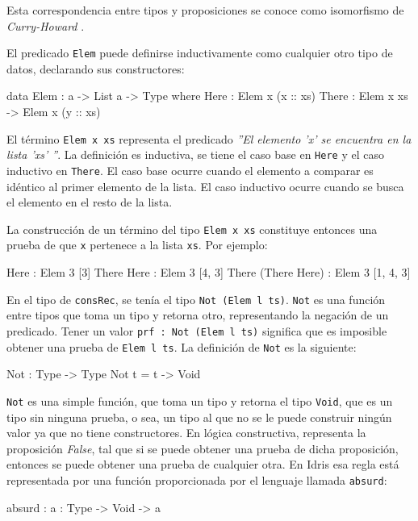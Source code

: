 Esta correspondencia entre tipos y proposiciones se conoce como isomorfismo de \textit{Curry-Howard} \cite{Howard80}.

El predicado \texttt{Elem} puede definirse inductivamente como cualquier otro tipo de datos, declarando sus constructores:

\begin{code}
data Elem : a -> List a -> Type where
  Here : Elem x (x :: xs)
  There : Elem x xs -> Elem x (y :: xs)
\end{code}

El término \texttt{Elem x xs} representa el predicado \textit{''El elemento 'x' se encuentra en la lista 'xs' ''}. La definición es inductiva, se tiene el caso base en \texttt{Here} y el caso inductivo en \texttt{There}. El caso base ocurre cuando el elemento a comparar es idéntico al primer elemento de la lista. El caso inductivo ocurre cuando se busca el elemento en el resto de la lista.

La construcción de un término del tipo \texttt{Elem x xs} constituye entonces una prueba de que \texttt{x} pertenece a la lista \texttt{xs}. Por ejemplo:

\begin{code}
Here : Elem 3 [3]
There Here : Elem 3 [4, 3]
There (There Here) : Elem 3 [1, 4, 3]
\end{code}

En el tipo de \texttt{consRec}, se tenía el tipo \texttt{Not (Elem l ts)}. \texttt{Not} es una función entre tipos que toma un tipo y retorna otro, representando la negación de un predicado. Tener un valor \texttt{prf : Not (Elem l ts)} significa que es imposible obtener una prueba de \texttt{Elem l ts}. La definición de \texttt{Not} es la siguiente:

\begin{code}
Not : Type -> Type
Not t = t -> Void
\end{code}

\texttt{Not} es una simple función, que toma un tipo y retorna el tipo  \texttt{Void}, que es un tipo sin ninguna prueba, o sea, un tipo al que no se le puede construir ningún valor ya que no tiene constructores. En lógica constructiva, representa la proposición \textit{False}, tal que si se puede obtener una prueba de dicha proposición, entonces se puede obtener una prueba de cualquier otra. En Idris esa regla está representada por una función proporcionada por el lenguaje llamada \texttt{absurd}:

\begin{code}
absurd : {a : Type} -> Void -> a
\end{code}

